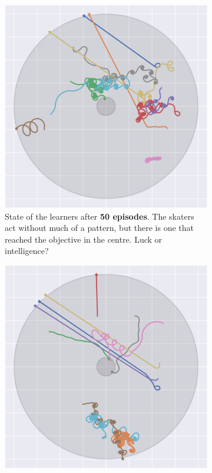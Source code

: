 \begin{figure}[H]
	\begin{subfigure}[t]{.48\textwidth}
		\includegraphics[width=\textwidth]{circle_images/image_50.png}
		\caption{State of the learners after \textbf{50 episodes}. The skaters act without much of a pattern, but there is one that reached the objective in the centre. Luck or intelligence?}
	\end{subfigure}\hfill{}
	\begin{subfigure}[t]{.48\textwidth}
		\includegraphics[width=\textwidth]{circle_images/image_100_alt_2.png}

\end{subfigure}
\end{figure}
